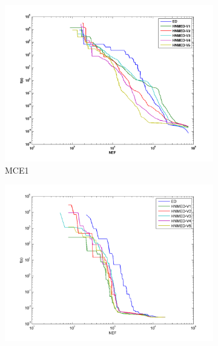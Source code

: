 \begin{table}
{\begin{tabular}{clcccccc}
			
			
			
			
			
			
		\end{tabular}
	}
\end{table}


\begin{figure}
	\centering
	\begin{subfigure}[b]{0.49\linewidth}
		\includegraphics[width=\linewidth]{Figures/B-Grafica_Convergencia_Problema_1}
		\caption{MCE1} \label{fig:M1} 
	\end{subfigure}
	\begin{subfigure}[b]{0.49\linewidth}
		\includegraphics[width=\textwidth]{Figures/B-Grafica_Convergencia_Problema_2}

\end{subfigure}
\end{figure}
